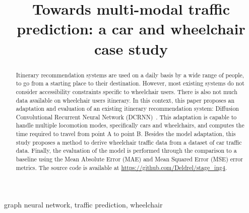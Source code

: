 \documentclass[conference]{IEEEtran}
\begin{document}
    \title{Towards multi-modal traffic prediction: a car and wheelchair case study}
    \author{
        \and
        \and
    }
    \maketitle

    \begin{abstract}
        Itinerary recommendation systems are used on a daily basis by a wide range of people, to go from a starting
        place to their destination.
        However, most existing systems do not consider accessibility constraints specific to wheelchair users.
        There is also not much data available on wheelchair users itinerary.
        In this context, this paper proposes an adaptation and evaluation of an existing itinerary recommendation
        system: Diffusion Convolutional Recurrent Neural Network (DCRNN)~\cite{DCRNN}.
        This adaptation is capable to handle multiple locomotion modes, specifically cars and wheelchairs, and computes
        the time required to travel from point A to point B\@.
        Besides the model adaptation, this study proposes a method to derive wheelchair traffic data from a dataset of
        car traffic data.
        Finally, the evaluation of the model is performed through the comparison to a baseline using the Mean Absolute
        Error (MAE) and Mean Squared Error (MSE) error metrics.
        The source code is available at \url{https://github.com/Deldrel/stage_ing4}.
    \end{abstract}

    \begin{IEEEkeywords}
        graph neural network, traffic prediction, wheelchair
    \end{IEEEkeywords}
\end{document}

